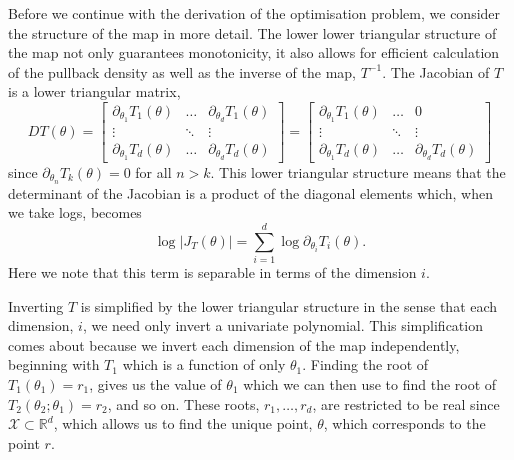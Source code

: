 \documentclass[final]{siamltex}
\begin{document}
Before we continue with the derivation of the optimisation problem, we consider the structure
of the map in more detail. The lower lower triangular structure of the map not only guarantees monotonicity, it also allows for efficient calculation of the pullback density as well as the inverse of the map, $T^{-1}$. The Jacobian of $T$ is a lower triangular matrix,
\[
	DT(\theta) = \begin{bmatrix}
		\partial_{\theta_1} T_1(\theta) & \dots & \partial_{\theta_d} T_1(\theta)\\
		\vdots & \ddots & \vdots \\
		\partial_{\theta_1} T_d(\theta) & \dots & \partial_{\theta_d} T_d(\theta)
	\end{bmatrix} = \begin{bmatrix}
		\partial_{\theta_1} T_1(\theta) & \dots & 0\\
		\vdots & \ddots & \vdots \\
		\partial_{\theta_1} T_d(\theta) & \dots & \partial_{\theta_d} T_d(\theta)
	\end{bmatrix}
\]
since $\partial_{\theta_n} T_k(\theta) = 0$ for all $n > k$. This lower triangular structure means that the determinant of the Jacobian is a product of the diagonal elements which, when we take logs, becomes
\begin{equation}\label{eqn:separable_jacobian}
	\log\left|J_T(\theta)\right| = \sum\limits_{i=1}^d \! \log \partial_{\theta_i} T_i(\theta).
\end{equation}
Here we note that this term is separable in terms of the dimension $i$.

Inverting $T$ is simplified by the lower triangular structure in the sense that each dimension, $i$, we need only invert a univariate polynomial. This simplification comes about because we invert each dimension of the map independently, beginning with $T_1$ which is a function of only $\theta_1$. Finding the root of $T_1(\theta_1) = r_1$, gives us the value of $\theta_1$ which we can then use to find the root of $T_2(\theta_2;\theta_1) = r_2$, and so on. These roots, $r_1,\dots,r_d$, are restricted to be real since $\mathcal{X} \subset \mathbb{R}^d$, which allows us to find the unique point, $\theta$, which corresponds to the point $r$.
\end{document}
